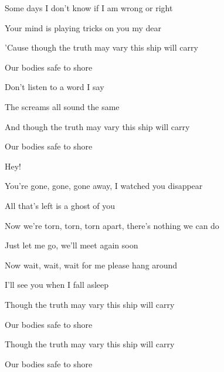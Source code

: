 \begin{song}
\bigskip

Some days I don't know if I am wrong or right \par
Your mind is playing tricks on you my dear \par
'Cause though the truth may vary this  ship will carry \par
{} \par
Our bodies safe to shore  \par

\bigskip

\begin{chorusbox}{\Chorus}
Don't listen to a word I say  \par
The screams all sound the same  \par
And though the truth may vary this  ship will carry \par
Our bodies safe to shore \par
\end{chorusbox}

\bigskip

   Hey!  \par

\bigskip

 \par
You're gone, gone, gone away, I watched you disappear \par
{}All that's left is a ghost of you \par
Now we're torn, torn, torn apart, there's nothing we can do \par
Just let me go, we'll meet again soon \par
{} \par
Now wait, wait, wait for me  please hang around \par
{} \par
I'll see you when I fall asleep  \par

\bigskip

\Chorus {}

\bigskip

 \par
Though the truth may vary this  ship will carry \par
Our bodies safe to shore  \par
Though the truth may vary this  ship will carry \par
Our bodies safe to shore  \par

\end{song}
